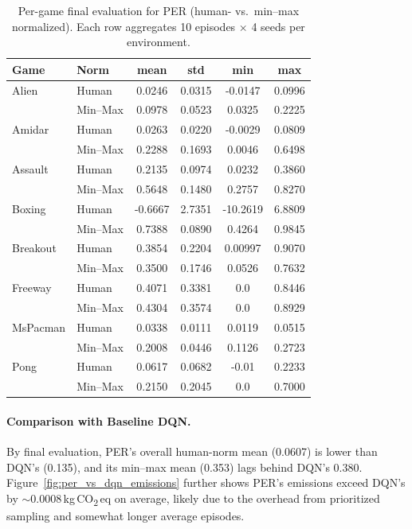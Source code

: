 \begin{table}
	\caption{Per-game final evaluation for PER (human- vs.\ min--max normalized). Each row aggregates 10 episodes $\times$ 4 seeds per environment.}
	\label{tab:per_eval_gamewise}
	\centering
	\begin{tabular}{llcccc}
		\toprule
		\textbf{Game} & \textbf{Norm} & \textbf{mean} & \textbf{std} & \textbf{min} & \textbf{max}\\
		\midrule
		Alien     & Human    & 0.0246 & 0.0315 & -0.0147 & 0.0996 \\
		& Min--Max & 0.0978 & 0.0523 & 0.0325  & 0.2225 \\
		\cmidrule{1-6}
		Amidar    & Human    & 0.0263 & 0.0220 & -0.0029 & 0.0809 \\
		& Min--Max & 0.2288 & 0.1693 & 0.0046  & 0.6498 \\
		\cmidrule{1-6}
		Assault   & Human    & 0.2135 & 0.0974 & 0.0232  & 0.3860 \\
		& Min--Max & 0.5648 & 0.1480 & 0.2757  & 0.8270 \\
		\cmidrule{1-6}
		Boxing    & Human    & -0.6667 & 2.7351 & -10.2619 & 6.8809 \\
		& Min--Max & 0.7388  & 0.0890 & 0.4264    & 0.9845 \\
		\cmidrule{1-6}
		Breakout  & Human    & 0.3854 & 0.2204 & 0.00997 & 0.9070 \\
		& Min--Max & 0.3500 & 0.1746 & 0.0526  & 0.7632 \\
		\cmidrule{1-6}
		Freeway   & Human    & 0.4071 & 0.3381 & 0.0     & 0.8446 \\
		& Min--Max & 0.4304 & 0.3574 & 0.0     & 0.8929 \\
		\cmidrule{1-6}
		MsPacman  & Human    & 0.0338 & 0.0111 & 0.0119 & 0.0515 \\
		& Min--Max & 0.2008 & 0.0446 & 0.1126 & 0.2723 \\
		\cmidrule{1-6}
		Pong      & Human    & 0.0617 & 0.0682 & -0.01 & 0.2233 \\
		& Min--Max & 0.2150 & 0.2045 & 0.0   & 0.7000 \\
		\bottomrule
	\end{tabular}
\end{table}

\paragraph{Comparison with Baseline DQN.}
By final evaluation, PER's overall human-norm mean (0.0607) is lower than DQN's (0.135), and its min--max mean (0.353) lags behind DQN's 0.380.  
Figure~\ref{fig:per_vs_dqn_emissions} further shows PER's emissions exceed DQN's by $\sim$\num{0.0008}\,kg\,CO\textsubscript{2}\,eq on average, likely due to the overhead from prioritized sampling and somewhat longer average episodes.

